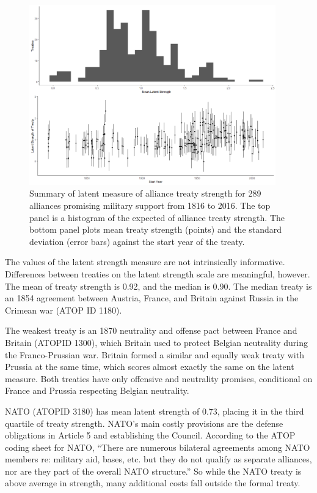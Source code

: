 \documentclass[12pt]{article}
\begin{document}
\begin{figure}
	\centering
		\includegraphics[width=0.95\textwidth]{../figures/ls-summary.png}
	\caption{Summary of latent measure of alliance treaty strength for 289 alliances promising military support from 1816 to 2016. The top panel is a histogram of the expected of alliance treaty strength. The bottom panel plots mean treaty strength (points) and the standard deviation (error bars) against the start year of the treaty.}
	\label{fig:ls-summary}
\end{figure}


The values of the latent strength measure are not intrinsically informative. 
Differences between treaties on the latent strength scale are meaningful, however. 
The mean of treaty strength is 0.92, and the median is 0.90. 
The median treaty is an 1854 agreement between Austria, France, and Britain against Russia in the Crimean war (ATOP ID 1180). 


The weakest treaty is an 1870 neutrality and offense pact between France and Britain (ATOPID 1300), which Britain used to protect Belgian neutrality during the Franco-Prussian war.  
Britain formed a similar and equally weak treaty with Prussia at the same time, which scores almost exactly the same on the latent measure. 
Both treaties have only offensive and neutrality promises, conditional on France and Prussia respecting Belgian neutrality. 


NATO (ATOPID 3180) has mean latent strength of 0.73, placing it in the third quartile of treaty strength. 
NATO's main costly provisions are the defense obligations in Article 5 and establishing the Council. 
According to the ATOP coding sheet for NATO, ``There are numerous bilateral agreements among NATO members re: military aid, bases, etc. but they do not qualify as separate alliances, nor are they part of the overall NATO structure.''
So while the NATO treaty is above average in strength, many additional costs fall outside the formal treaty.    
\end{document}
